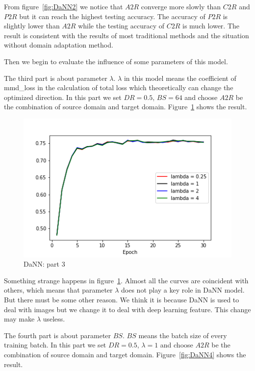 \documentclass[conference]{IEEEtran}
\begin{document}
From figure~\ref{fig:DaNN2} we notice that $A2R$ converge more slowly than $C2R$ and $P2R$ but it can reach the highest testing accuracy. The accuracy of $P2R$ is slightly lower than $A2R$ while the testing accuracy of $C2R$ is much lower. The result is consistent with the results of most traditional methods and the situation without domain adaptation method.

Then we begin to evaluate the influence of some parameters of this model.

The third part is about parameter $\lambda$. $\lambda$ in this model means the coefficient of mmd\_loss in the calculation of total loss which theoretically can change the optimized direction. In this part we set $DR = 0.5$, $BS = 64$ and choose $A2R$ be the combination of source domain and target domain. Figure~\ref{fig:DaNN3} shows the result.
\begin{figure}[!h]
    \centerline{\includegraphics[scale=0.4]{HDaNN/DaNN_fig3.png}}
    \caption{DaNN: part 3}
    \label{fig:DaNN3}
\end{figure}

Something strange happens in figure~\ref{fig:DaNN3}. Almost all the curves are coincident with others, which means that parameter $\lambda$ does not play a key role in DaNN model. But there must be some other reason. We think it is because DaNN is used to deal with images but we change it to deal with deep learning feature. This change may make $\lambda$ useless.

The fourth part is about parameter $BS$. $BS$ means the batch size of every training batch. In this part we set $DR = 0.5$, $\lambda = 1$ and choose $A2R$ be the combination of source domain and target domain. Figure~\ref{fig:DaNN4} shows the result.
\end{document}

